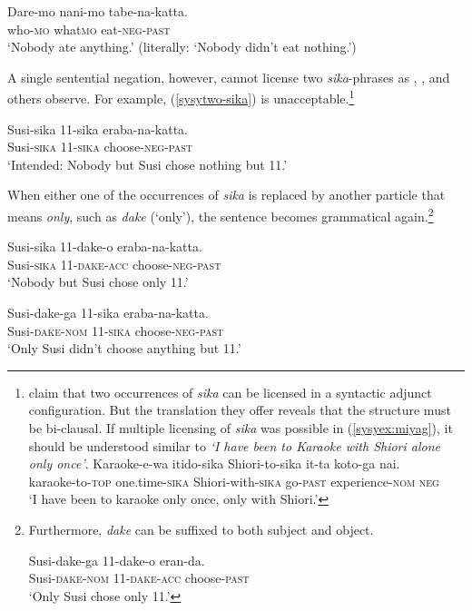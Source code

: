 \documentclass[output=paper,colorlinks,citecolor=brown,
]{langscibook}
\def\refp#1{(\ref{sy#1})}
\def\M#1{\textsc{#1}}
\begin{document}
\ea \label{syex:negconc}
 \gll Dare-mo nani-mo tabe-na-katta.\\
who-\M{mo} what\M{mo} eat-\M{neg}-\M{past}\\
\glt `Nobody ate anything.' (literally: `Nobody didn't eat nothing.')\z

A single sentential negation, however, cannot license two \emph{sika}-phrases as \cite{aoyagi94}, \cite{kawahara08a}, \cite{miyagawa16a} and others observe.  
For example, \refp{sytwo-sika} is unacceptable.\footnote{\cite[(28b)]{miyagawa16a} claim that two occurrences of \emph{sika} can be licensed in a syntactic adjunct configuration.  But the translation they offer reveals that the structure must be bi-clausal.  If multiple licensing of \emph{sika} was possible in \refp{syex:miyag}, it should be understood similar to \emph{`I have been to Karaoke with Shiori alone only once'}.
\ea \label{syex:miyag}
\gll Karaoke-e-wa itido-sika Shiori-to-sika it-ta koto-ga nai.\\ karaoke-to-\M{top} one.time-\M{sika} Shiori-with-\M{sika} go-\M{past} experience-\M{nom} \M{neg}\\
\glt ‘I have been to karaoke only once, only with Shiori.’ 
\z
}

\ea \label{sytwo-sika}
\gll *Susi-sika 11-sika eraba-na-katta.\\
Susi-\M{sika} 11-\M{sika} choose-\M{neg}-\M{past}\\
\trans `Intended: Nobody but Susi chose nothing but 11.'\z

When either one of the occurrences of \emph{sika} is replaced by another particle that means \emph{only}, such as \emph{dake} (`only'), the sentence becomes grammatical again.\footnote{Furthermore, \emph{dake} can be suffixed to both subject and object.

\ea \gll Susi-dake-ga 11-dake-o eran-da.\\
Susi-\M{dake}-\M{nom} 11-\M{dake}-\M{acc} choose-\M{past}\\
\glt `Only Susi chose only 11.'\z}

\ea \gll Susi-sika 11-dake-o eraba-na-katta.\\
Susi-\M{sika} 11-\M{dake}-\M{acc} choose-\M{neg}-\M{past}\\
\glt `Nobody but Susi chose only 11.'\z

\ea \gll Susi-dake-ga 11-sika eraba-na-katta.\\
Susi-\M{dake}-\M{nom} 11-\M{sika} choose-\M{neg}-\M{past}\\
\glt `Only Susi didn't choose anything but 11.'\z
\end{document}
